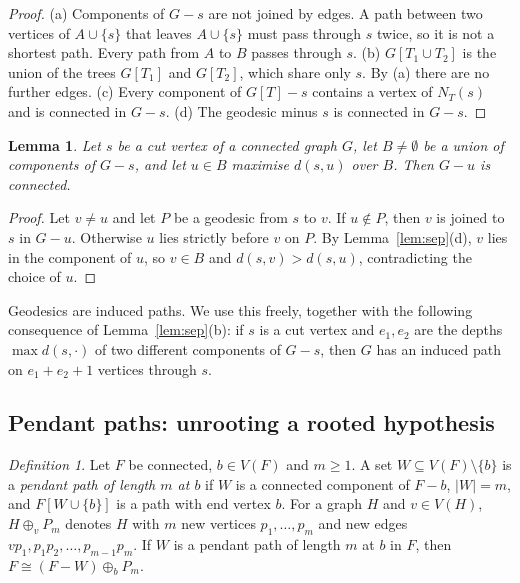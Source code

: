 \documentclass[11pt,a4paper]{article}
\newtheorem{lemma}[theorem]{Lemma}
\theoremstyle{remark}
\newtheorem{definition}[theorem]{Definition}
\newcommand{\plus}{\oplus}
\begin{document}
\begin{proof}
(a) Components of $G-s$ are not joined by edges. A path between two vertices of $A\cup\{s\}$ that leaves $A\cup\{s\}$ must pass through $s$ twice, so it is not a shortest path. Every path from $A$ to $B$ passes through $s$.
(b) $G[T_1\cup T_2]$ is the union of the trees $G[T_1]$ and $G[T_2]$, which share only $s$. By (a) there are no further edges.
(c) Every component of $G[T]-s$ contains a vertex of $N_T(s)$ and is connected in $G-s$.
(d) The geodesic minus $s$ is connected in $G-s$.
\end{proof}

\begin{lemma}\label{lem:farthest}
Let $s$ be a cut vertex of a connected graph $G$, let $B\neq\emptyset$ be a union of components of $G-s$, and let $u\in B$ maximise $d(s,u)$ over $B$. Then $G-u$ is connected.
\end{lemma}

\begin{proof}
Let $v\ne u$ and let $P$ be a geodesic from $s$ to $v$. If $u\notin P$, then $v$ is joined to $s$ in $G-u$. Otherwise $u$ lies strictly before $v$ on $P$. By Lemma~\ref{lem:sep}(d), $v$ lies in the component of $u$, so $v\in B$ and $d(s,v)>d(s,u)$, contradicting the choice of $u$.
\end{proof}

Geodesics are induced paths. We use this freely, together with the following consequence of Lemma~\ref{lem:sep}(b): if $s$ is a cut vertex and $e_1,e_2$ are the depths $\max d(s,\cdot)$ of two different components of $G-s$, then $G$ has an induced path on $e_1+e_2+1$ vertices through $s$.

\subsection{Pendant paths: unrooting a rooted hypothesis}\label{sec:pendant}

\begin{definition}
Let $F$ be connected, $b\in V(F)$ and $m\ge1$. A set $W\subseteq V(F)\setminus\{b\}$ is a \emph{pendant path of length $m$ at $b$} if $W$ is a connected component of $F-b$, $|W|=m$, and $F[W\cup\{b\}]$ is a path with end vertex $b$. For a graph $H$ and $v\in V(H)$, $H\plus_v P_m$ denotes $H$ with $m$ new vertices $p_1,\dots,p_m$ and new edges $vp_1,p_1p_2,\dots,p_{m-1}p_m$. If $W$ is a pendant path of length $m$ at $b$ in $F$, then $F\cong (F-W)\plus_b P_m$.
\end{definition}
\end{document}
